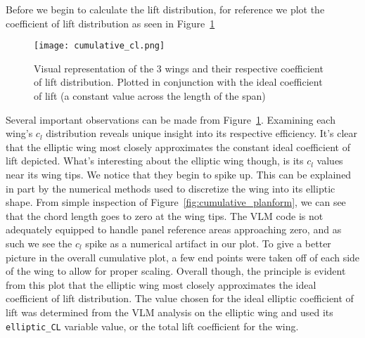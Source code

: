 \documentclass{article}
\begin{document}
Before we begin to calculate the lift distribution, for reference we plot the coefficient of lift distribution as seen in Figure~\ref{fig:cumulative_cl}
\begin{figure}[ht]
    \centering
    \texttt{[image: cumulative\_cl.png]}
    \caption{Visual representation of the 3 wings and their respective coefficient of lift distribution. Plotted in conjunction with the ideal coefficient of lift (a constant value across the length of the span)}\label{fig:cumulative_cl}
\end{figure}

Several important observations can be made from Figure~\ref{fig:cumulative_cl}.
Examining each wing's $c_l$ distribution reveals unique insight into its respective efficiency. It's clear that the elliptic wing most closely approximates the constant ideal coefficient of lift depicted. What's interesting about the elliptic wing though, is its $c_l$ values near its wing tips.
We notice that they begin to spike up. This can be explained in part by the numerical methods used to discretize the wing into its elliptic shape. From simple inspection of Figure~\ref{fig:cumulative_planform}, we can see that the chord length goes to zero at the wing tips.
The VLM code is not adequately equipped to handle panel reference areas approaching zero, and as such we see the $c_l$ spike as a numerical artifact in our plot. To give a better picture in the overall cumulative plot, a few end points were taken off of each side of the wing to allow for proper scaling.
Overall though, the principle is evident from this plot that the elliptic wing most closely approximates the ideal coefficient of lift distribution.
The value chosen for the ideal elliptic coefficient of lift was determined from the VLM analysis on the elliptic wing and used its \texttt{elliptic\_CL} variable value, or the total lift coefficient for the wing.
\end{document}
